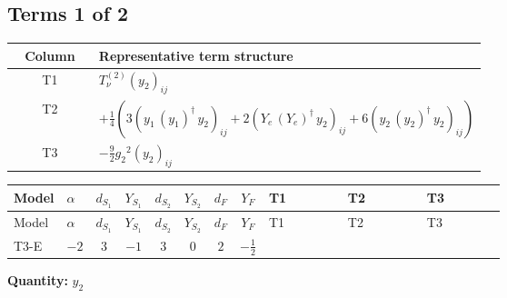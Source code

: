 \documentclass[8pt]{article}
\begin{document}
\begin{landscape}
\subsection*{Terms 1 of 2}
\begin{center}
\begin{tabular}{@{}c >{\raggedright\arraybackslash}p{0.82\linewidth}@{}}
\toprule
Column & Representative term structure \\
\midrule
T1 & \(\displaystyle T_{\nu}^{(2)} \left({y_2}\right)_{ij}\) \\
\midrule
T2 & \(\displaystyle +\frac{1}{4} (3 \left({y_1}\,\left({y_1}\right)^{\dagger}\,{y_2}\right)_{ij}+2 \left({Y_e}\,\left({Y_e}\right)^{\dagger}\,{y_2}\right)_{ij}+6 \left({y_2}\,\left({y_2}\right)^{\dagger}\,{y_2}\right)_{ij})\) \\
\midrule
T3 & \(\displaystyle -\frac{9}{2} {g_2}^2 \left({y_2}\right)_{ij}\) \\
\midrule
\bottomrule
\end{tabular}
\end{center}
\smallskip
\tiny
\begin{longtable}{@{}llcccccc >{\raggedright\arraybackslash}p{0.21\linewidth} >{\raggedright\arraybackslash}p{0.21\linewidth} >{\raggedright\arraybackslash}p{0.21\linewidth}@{}}
\toprule
Model & $\alpha$ & $d_{S_1}$ & $Y_{S_1}$ & $d_{S_2}$ & $Y_{S_2}$ & $d_F$ & $Y_F$ & T1 & T2 & T3 \\
\midrule
\endfirsthead
\toprule
Model & $\alpha$ & $d_{S_1}$ & $Y_{S_1}$ & $d_{S_2}$ & $Y_{S_2}$ & $d_F$ & $Y_F$ & T1 & T2 & T3 \\
\midrule
\endhead
T3-E & $-2$ & $3$ & $-1$ & $3$ & $0$ & $2$ & $-\frac{1}{2}$ & \scriptsize\adjustbox{max width=\linewidth}{$\begin{gathered} T_{\nu}^{(2)} \left({y_2}\right)_{ij}\end{gathered}$} & \scriptsize\adjustbox{max width=\linewidth}{$\begin{gathered} +\frac{1}{4} (3 \left({y_1}\,\left({y_1}\right)^{\dagger}\,{y_2}\right)_{ij}+2 \left({Y_e}\,\left({Y_e}\right)^{\dagger}\,{y_2}\right)_{ij}+6 \left({y_2}\,\left({y_2}\right)^{\dagger}\,{y_2}\right)_{ij})\end{gathered}$} & \scriptsize\adjustbox{max width=\linewidth}{$\begin{gathered} -\frac{9}{2} {g_2}^2 \left({y_2}\right)_{ij}\end{gathered}$} \\
\midrule
\bottomrule
\end{longtable}
\clearpage
\noindent\textbf{Quantity: }$y_2$\par\smallskip

\end{landscape}
\end{document}
